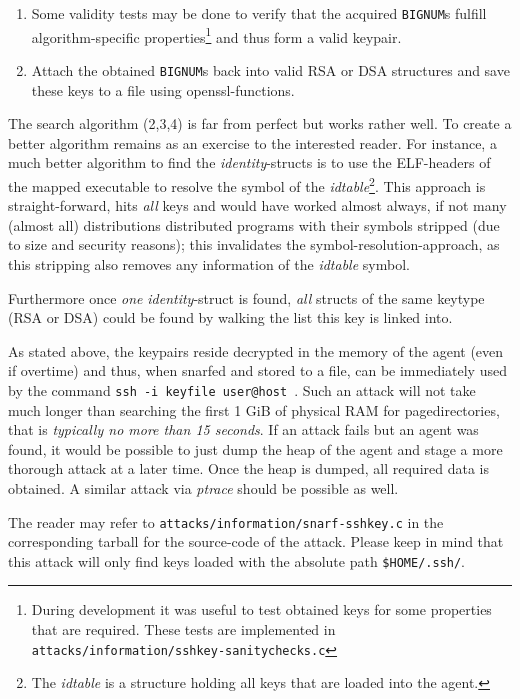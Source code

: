 \begin{enumerate}
	\item Some validity tests may be done to verify that the acquired
	\texttt{BIGNUM}s fulfill algorithm-specific properties\footnote{During
	development it was useful to test obtained keys for some properties that
	are required. These tests are implemented in
	\texttt{attacks/information/sshkey-sanitychecks.c}} and thus form a
	valid keypair.

	\item Attach the obtained \texttt{BIGNUM}s back into valid RSA or DSA
	structures and save these keys to a file using openssl-functions.
	
\end{enumerate}
	
The search algorithm (2,3,4) is far from perfect but works rather well.  To
create a better algorithm remains as an exercise to the interested reader. For
instance, a much better algorithm to find the \emph{identity}-structs is to use
the ELF-headers of the mapped executable to resolve the symbol of the
\emph{idtable}\footnote{The \emph{idtable} is a structure holding all keys that
are loaded into the agent.}. This approach is straight-forward, hits \emph{all}
keys and would have worked almost always, if not many (almost all) distributions
distributed programs with their symbols stripped (due to size and security
reasons); this invalidates the symbol-resolution-approach, as this stripping
also removes any information of the \emph{idtable} symbol.

Furthermore once \emph{one} \emph{identity}-struct is found, \emph{all} structs
of the same keytype (RSA or DSA) could be found by walking the list this key is
linked into.

As stated above, the keypairs reside decrypted in the memory of the agent (even
if overtime) and thus, when snarfed and stored to a file, can be immediately
used by the command \texttt{ssh~-i~keyfile~user@host}~.  Such an attack will not
take much longer than searching the first 1 GiB of physical RAM for
pagedirectories, that is \emph{typically no more than 15 seconds}. If an attack
fails but an agent was found, it would be possible to just dump the heap of the
agent and stage a more thorough attack at a later time. Once the heap is dumped,
all required data is obtained. A similar attack via \emph{ptrace} should be
possible as well.

The reader may refer to \texttt{attacks/information/snarf-sshkey.c} in the
corresponding tarball for the source-code of the attack. Please keep in mind
that this attack will only find keys loaded with the absolute path
\texttt{\$HOME/.ssh/}.


